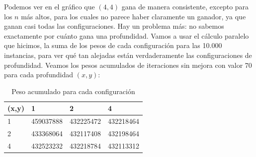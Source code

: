 \begin{figure}[H]
    \begin{minipage}[t]{\linewidth}
		\centering
		\label{fig:ejercicio-5-configuracion-profundidad-conjunto-1}
    \end{minipage}
\end{figure}
Podemos ver en el gráfico que $(4,4)$ gana de manera consistente, excepto para los $n$ más altos, para los cuales no parece haber claramente un ganador, ya que ganan casi todas las configuraciones. Hay un problema más: no sabemos exactamente por cuánto gana una profundidad. Vamos a usar el cálculo paralelo que hicimos, la suma de los pesos de cada configuración para las 10.000 instancias, para ver qué tan alejadas están verdaderamente las configuraciones de profundidad. Veamos los pesos acumulados de iteraciones sin mejora con valor 70 para cada profundidad $(x,y)$:
\begin{table}[H]
    \begin{center}
        \begin{tabular}{ | l | l | l | l |}
        \hline
        (x,y)   & 1                 & 2                 & 4 \\ \hline
        1       & 459037888         & 432225472         & 432218464 \\ \hline
        2       & 433368064         & 432117408         & 432198464 \\ \hline
        4       & 432523232         & 432218784         & 432113312 \\
        \hline
        \end{tabular}
        \caption{Peso acumulado para cada configuración}
    \end{center}
\end{table}
